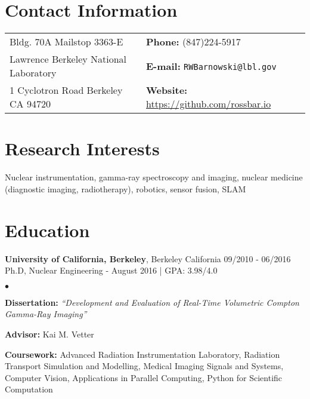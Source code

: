 \documentclass[margin,line]{res}
\newenvironment{list2}{
  \begin{list}{$\bullet$}{%
      \setlength{\itemsep}{0in}
      \setlength{\parsep}{0in} \setlength{\parskip}{0in}
      \setlength{\topsep}{0in} \setlength{\partopsep}{0in} 
      \setlength{\leftmargin}{0.2in}}}{\end{list}}
\begin{document}
\address{\large Postdoctoral Scholar, Applied Nuclear Physics}
\address{\large Lawrence Berkeley National Laboratory}

\begin{resume}
\section{\sc Contact Information}
\vspace{.05in}
\begin{tabular}{@{}p{3in}p{4in}}
Bldg. 70A Mailstop 3363-E             & {\bf Phone:}   (847)224-5917 \\            
Lawrence Berkeley National Laboratory & {\bf E-mail:}  {\tt RWBarnowski@lbl.gov} \\       
1 Cyclotron Road Berkeley CA 94720    & {\bf Website:} \url{https://github.com/rossbar.io} \\     
\end{tabular}


\section{\sc Research Interests}
Nuclear instrumentation, gamma-ray spectroscopy and imaging, nuclear medicine
(diagnostic imaging, radiotherapy), robotics, sensor fusion, SLAM

\section{\sc Education}
{\bf University of California, Berkeley}, Berkeley California \hfill 09/2010 - 06/2016\\
Ph.D, Nuclear Engineering - August 2016 | GPA: 3.98/4.0
\begin{list2}
\item {\bf \small Dissertation:} {\em``Development and Evaluation of Real-Time
                                        Volumetric Compton Gamma-Ray Imaging''} 
\item {\bf \small Advisor:}  Kai M. Vetter
\item {\bf \small Coursework:} Advanced Radiation Instrumentation Laboratory,
                               Radiation Transport Simulation and Modelling,
                               Medical Imaging Signals and Systems, Computer
                               Vision, Applications in Parallel Computing,
                               Python for Scientific Computation
\end{list2}


\end{resume}
\end{document}
